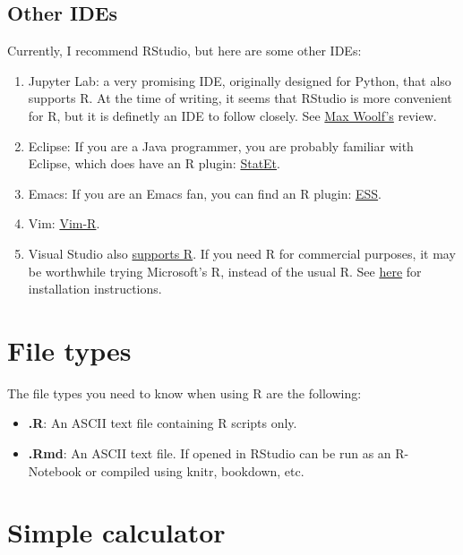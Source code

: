 \documentclass[]{book}
\providecommand{\tightlist}{%
  \setlength{\itemsep}{0pt}\setlength{\parskip}{0pt}}
\theoremstyle{definition}
\theoremstyle{definition}
\theoremstyle{definition}
\theoremstyle{remark}
\begin{document}
\subsection{Other IDEs}\label{other-ides}

Currently, I recommend RStudio, but here are some other IDEs:

\begin{enumerate}
\def\labelenumi{\arabic{enumi}.}
\item
  Jupyter Lab: a very promising IDE, originally designed for Python,
  that also supports R. At the time of writing, it seems that RStudio is
  more convenient for R, but it is definetly an IDE to follow closely.
  See \href{http://minimaxir.com/2017/06/r-notebooks/}{Max Woolf's}
  review.
\item
  Eclipse: If you are a Java programmer, you are probably familiar with
  Eclipse, which does have an R plugin:
  \href{http://www.walware.de/goto/statet}{StatEt}.
\item
  Emacs: If you are an Emacs fan, you can find an R plugin:
  \href{http://ess.r-project.org/}{ESS}.
\item
  Vim: \href{https://github.com/vim-scripts/Vim-R-plugin}{Vim-R}.
\item
  Visual Studio also
  \href{https://www.visualstudio.com/vs/features/rtvs/}{supports R}. If
  you need R for commercial purposes, it may be worthwhile trying
  Microsoft's R, instead of the usual R. See
  \href{https://mran.microsoft.com/documents/rro/installation}{here} for
  installation instructions.
\end{enumerate}

\section{File types}\label{file-types}

The file types you need to know when using R are the following:

\begin{itemize}
\tightlist
\item
  \textbf{.R}: An ASCII text file containing R scripts only.
\item
  \textbf{.Rmd}: An ASCII text file. If opened in RStudio can be run as
  an R-Notebook or compiled using knitr, bookdown, etc.
\end{itemize}

\section{Simple calculator}\label{simple-calculator}
\end{document}

